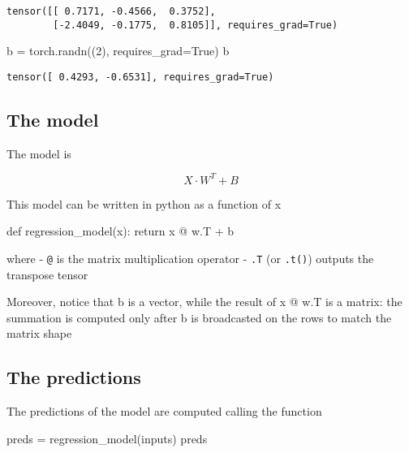 \documentclass[
  letterpaper,
  DIV=11,
  numbers=noendperiod]{scrartcl}
\newenvironment{Shaded}{\begin{snugshade}}{\end{snugshade}}
\newcommand{\ControlFlowTok}[1]{\textcolor[rgb]{0.00,0.23,0.31}{#1}}
\newcommand{\DecValTok}[1]{\textcolor[rgb]{0.68,0.00,0.00}{#1}}
\newcommand{\KeywordTok}[1]{\textcolor[rgb]{0.00,0.23,0.31}{#1}}
\newcommand{\NormalTok}[1]{\textcolor[rgb]{0.00,0.23,0.31}{#1}}
\newcommand{\OperatorTok}[1]{\textcolor[rgb]{0.37,0.37,0.37}{#1}}
\newcommand{\VariableTok}[1]{\textcolor[rgb]{0.07,0.07,0.07}{#1}}
\begin{document}
\begin{verbatim}
tensor([[ 0.7171, -0.4566,  0.3752],
        [-2.4049, -0.1775,  0.8105]], requires_grad=True)
\end{verbatim}

\begin{Shaded}
\begin{Highlighting}[]
\NormalTok{b }\OperatorTok{=}\NormalTok{ torch.randn((}\DecValTok{2}\NormalTok{), requires\_grad}\OperatorTok{=}\VariableTok{True}\NormalTok{)}
\NormalTok{b}
\end{Highlighting}
\end{Shaded}

\begin{verbatim}
tensor([ 0.4293, -0.6531], requires_grad=True)
\end{verbatim}

\hypertarget{the-model}{%
\subsection{The model}\label{the-model}}

The model is

\[X \cdot W^{T} + B\]

This model can be written in python as a function of x

\begin{Shaded}
\begin{Highlighting}[]
\KeywordTok{def}\NormalTok{ regression\_model(x):}
    \ControlFlowTok{return}\NormalTok{ x }\OperatorTok{@}\NormalTok{ w.T }\OperatorTok{+}\NormalTok{ b}
\end{Highlighting}
\end{Shaded}

where - \texttt{@} is the matrix multiplication operator - \texttt{.T}
(or \texttt{.t()}) outputs the transpose tensor

Moreover, notice that b is a vector, while the result of x @ w.T is a
matrix: the summation is computed only after b is broadcasted on the
rows to match the matrix shape

\hypertarget{the-predictions}{%
\subsection{The predictions}\label{the-predictions}}

The predictions of the model are computed calling the function

\begin{Shaded}
\begin{Highlighting}[]
\NormalTok{preds }\OperatorTok{=}\NormalTok{ regression\_model(inputs)}
\NormalTok{preds}
\end{Highlighting}
\end{Shaded}
\end{document}
